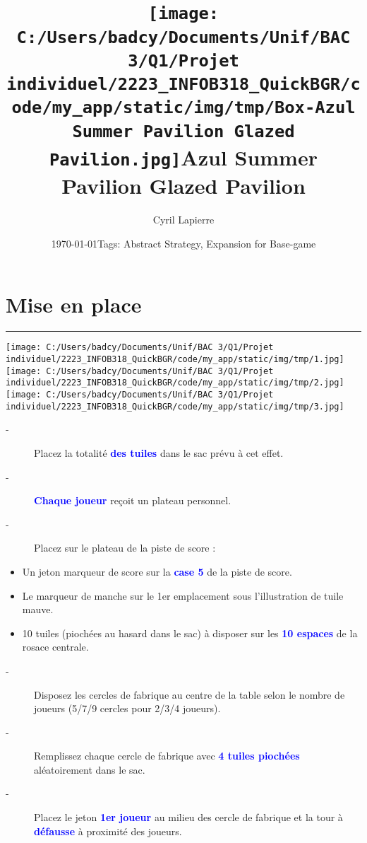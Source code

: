 \documentclass{scrartcl}%
\title{\texttt{[image: C:/Users/badcy/Documents/Unif/BAC 3/Q1/Projet individuel/2223\_INFOB318\_QuickBGR/code/my\_app/static/img/tmp/Box-Azul Summer Pavilion Glazed Pavilion.jpg]}\break Azul Summer Pavilion Glazed Pavilion }%
\author{Cyril Lapierre}%
\date{\today \break Tags: Abstract Strategy, Expansion for Base-game}%
\begin{document}
%
\normalsize%
\maketitle\thispagestyle{header}%
\pagestyle{header}%
\sectionfont{\color{blue}}%
\subsectionfont{\color{blue}}%
\subsubsectionfont{\color{blue}}%
\section{ Mise en place
}%
\label{sec:Miseenplace}%
\textcolor{blue}{\rule{18cm}{0.07cm}}\break%
%
\texttt{[image: C:/Users/badcy/Documents/Unif/BAC 3/Q1/Projet individuel/2223\_INFOB318\_QuickBGR/code/my\_app/static/img/tmp/1.jpg]}%
\texttt{[image: C:/Users/badcy/Documents/Unif/BAC 3/Q1/Projet individuel/2223\_INFOB318\_QuickBGR/code/my\_app/static/img/tmp/2.jpg]}%
\texttt{[image: C:/Users/badcy/Documents/Unif/BAC 3/Q1/Projet individuel/2223\_INFOB318\_QuickBGR/code/my\_app/static/img/tmp/3.jpg]}%

%
\begin{description}%
\item[{-} ]%
%
 Placez la totalité %
\textcolor{blue}{%
\textbf{des tuiles}%
}%
\textit{ }%
 dans le sac prévu à cet effet.
%
\item[{-} ]%
%
\textcolor{blue}{%
\textbf{Chaque joueur}%
}%
\textit{ }%
 reçoit un plateau personnel.
%
\item[{-} ]%
%
 Placez sur le plateau de la piste de score :
%
\end{description}%
\begin{itemize}%
\item%
%
 Un jeton marqueur de score sur la %
\textcolor{blue}{%
\textbf{case 5}%
}%
\textit{ }%
 de la piste de score.
%
\item%
%
 Le marqueur de manche sur le 1er emplacement sous l’illustration de tuile mauve.
%
\item%
%
 10 tuiles (piochées au hasard dans le sac) à disposer sur les %
\textcolor{blue}{%
\textbf{10 espaces}%
}%
\textit{ }%
 de la rosace centrale.
%
\end{itemize}%
\begin{description}%
\item[{-} ]%
%
 Disposez les cercles de fabrique au centre de la table selon le nombre de joueurs (5/7/9 cercles pour 2/3/4 joueurs).
%
\item[{-} ]%
%
 Remplissez chaque cercle de fabrique avec %
\textcolor{blue}{%
\textbf{4 tuiles piochées}%
}%
\textit{ }%
 aléatoirement dans le sac.
%
\item[{-} ]%
%
 Placez le jeton %
\textcolor{blue}{%
\textbf{1er joueur}%
}%
\textit{ }%
 au milieu des cercle de fabrique et la tour à %
\textcolor{blue}{%
\textbf{défausse}%
}%
\textit{ }%
 à proximité des joueurs.
%
\end{description}
\end{document}
